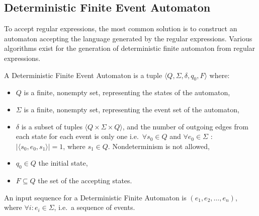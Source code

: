 	
		\subsection{Deterministic Finite Event Automaton}
			To accept regular expressions, the most common solution is to construct an automaton accepting the language generated by the regular expressions. Various  algorithms exist for the generation of deterministic finite automaton from regular expressions. 
			
			\begin{dfn}
				\label{dfn:cep:ea}
				A Deterministic Finite Event Automaton is a tuple $\langle Q,\Sigma,\delta,q_0, F \rangle$\citep{lam2006compilers} where: 
					\begin{itemize}
						\item $Q$ is a finite, nonempty set, representing the states of the automaton,
						\item $\Sigma$ is a finite, nonempty set, representing the event set of the automaton,
						\item $\delta$ is a subset of tuples $\langle Q \times \Sigma \times Q \rangle$,
							and the number of outgoing edges from each state for each event is only one 
							i.e.~$\forall s_0 \in Q$ and $\forall e_0 \in \Sigma$ : $|\langle s_0, e_0, s_1 \rangle| = 1$, where $s_1 \in Q$. Nondeterminism is not allowed,
						\item $q_0 \in Q$ the initial state,
						\item $F \subseteq Q$ the set of the accepting states.
					\end{itemize}	
			\end{dfn}
		
			\begin{dfn}
				\label{dfn:cep:ea:inputseq}
				An input sequence for a Deterministic Finite Automaton is $(e_1, e_2, \dots, e_n )$, where $\forall i : e_i \in \Sigma$, i.e.~a sequence of events.
			\end{dfn}
		
